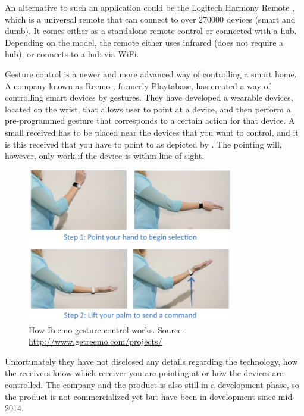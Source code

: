 An alternative to such an application could be the Logitech Harmony Remote \cite{HARMONYREMOTE}, 
which is a universal remote that can connect to over \num{270000} devices (smart and dumb). 
It comes either as a standalone remote control or connected with a hub. 
Depending on the model, the remote either uses infrared (does not require a hub), 
or connects to a hub via WiFi. 

Gesture control is a newer and more advanced way of controlling a smart home. 
A company known as Reemo \cite{Reemo}, formerly Playtabase, has created a way of controlling smart devices by gestures. 
They have developed a wearable devices, located on the wrist, that allows user to point at a device, 
and then perform a pre-programmed gesture that corresponds to a certain action for that device. 
A small received has to be placed near the devices that you want to control, 
and it is this received that you have to point to as depicted by . 
The pointing will, however, only work if the device is within line of sight. 

\begin{figure}[!htb]
    \centering
    \includegraphics[width=0.8\textwidth]{images/Reemo}
    \caption{How Reemo gesture control works. Source: \url{http://www.getreemo.com/projects/}}
    \label{fig:reemo}
\end{figure}

Unfortunately they have not disclosed any details regarding the technology, 
how the receivers know which receiver you are pointing at or how the devices are controlled. 
The company and the product is also still in a development phase, 
so the product is not commercialized yet but have been in development since mid-2014.

